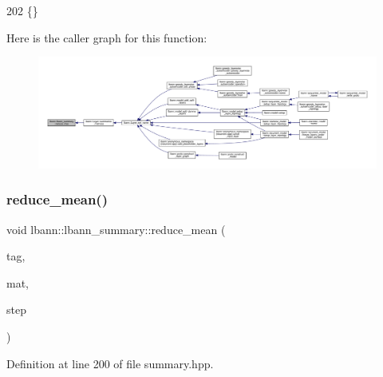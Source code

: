\begin{DoxyCode}
202 \{\}
\end{DoxyCode}
Here is the caller graph for this function\+:\nopagebreak
\begin{figure}[H]
\begin{center}
\leavevmode
\includegraphics[width=350pt]{classlbann_1_1lbann__summary_abebb44b0ea225aba2b98b24ccc8eb427_icgraph}
\end{center}
\end{figure}
\mbox{\label{classlbann_1_1lbann__summary_a8f63a3f2566d5d13e5ae24e727523c44}} 
\subsubsection{\texorpdfstring{reduce\+\_\+mean()}{reduce\_mean()}}
{\footnotesize\ttfamily void lbann\+::lbann\+\_\+summary\+::reduce\+\_\+mean (\begin{DoxyParamCaption}\item[{const std\+::string}]{tag,  }\item[{const \hyperlink{base_8hpp_a9a697a504ae84010e7439ffec862b470}{Abs\+Dist\+Mat} \&}]{mat,  }\item[{int}]{step }\end{DoxyParamCaption})\hspace{0.3cm}{\ttfamily [inline]}}



Definition at line 200 of file summary.\+hpp.


